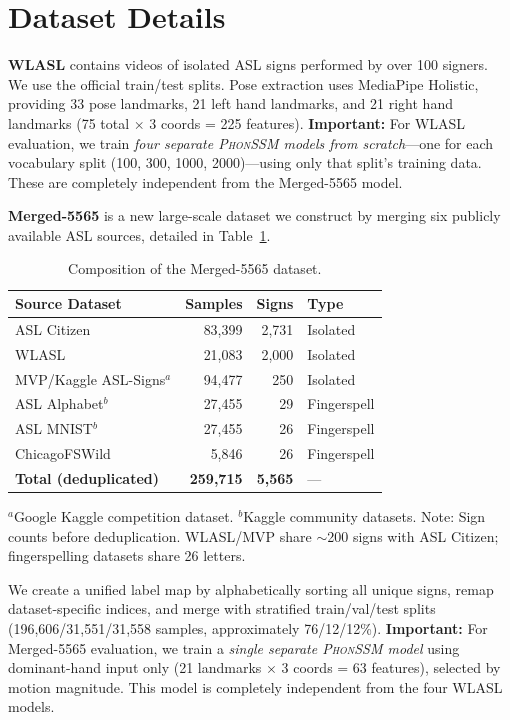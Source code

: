 \documentclass[sigconf,nonacm,anonymous]{acmart}
\theoremstyle{definition}
\theoremstyle{remark}
\newcommand{\phonssm}{\textsc{PhonSSM}}
\begin{document}
\section{Dataset Details}
\label{app:datasets}

\textbf{WLASL} \cite{li2020word} contains videos of isolated ASL signs performed by over 100 signers. We use the official train/test splits. Pose extraction uses MediaPipe Holistic, providing 33 pose landmarks, 21 left hand landmarks, and 21 right hand landmarks (75 total $\times$ 3 coords = 225 features). \textbf{Important:} For WLASL evaluation, we train \textit{four separate \phonssm{} models from scratch}---one for each vocabulary split (100, 300, 1000, 2000)---using only that split's training data. These are completely independent from the Merged-5565 model.

\textbf{Merged-5565} is a new large-scale dataset we construct by merging six publicly available ASL sources, detailed in Table~\ref{tab:merged_sources}.

\begin{table}[ht]
\caption{Composition of the Merged-5565 dataset.}
\label{tab:merged_sources}
\begin{center}
\small
\begin{tabular}{lrrl}
\toprule
Source Dataset & Samples & Signs & Type \\
\midrule
ASL Citizen \cite{desai2023asl} & 83,399 & 2,731 & Isolated \\
WLASL \cite{li2020word} & 21,083 & 2,000 & Isolated \\
MVP/Kaggle ASL-Signs$^a$ & 94,477 & 250 & Isolated \\
\addlinespace
ASL Alphabet$^b$ & 27,455 & 29 & Fingerspell \\
ASL MNIST$^b$ & 27,455 & 26 & Fingerspell \\
ChicagoFSWild \cite{shi2019fingerspelling} & 5,846 & 26 & Fingerspell \\
\midrule
\textbf{Total (deduplicated)} & \textbf{259,715} & \textbf{5,565} & --- \\
\bottomrule
\end{tabular}
\end{center}
{\footnotesize $^a$Google Kaggle competition dataset. $^b$Kaggle community datasets. Note: Sign counts before deduplication. WLASL/MVP share ${\sim}$200 signs with ASL Citizen; fingerspelling datasets share 26 letters.}
\end{table}

We create a unified label map by alphabetically sorting all unique signs, remap dataset-specific indices, and merge with stratified train/val/test splits (196,606/31,551/31,558 samples, approximately 76/12/12\%). \textbf{Important:} For Merged-5565 evaluation, we train a \textit{single separate \phonssm{} model} using dominant-hand input only (21 landmarks $\times$ 3 coords = 63 features), selected by motion magnitude. This model is completely independent from the four WLASL models.
\end{document}
